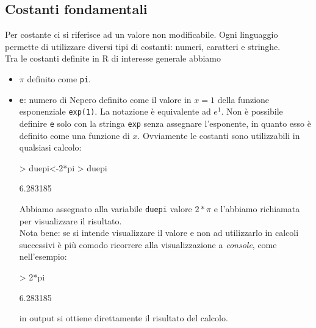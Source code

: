 \documentclass[onecolumn,11pt]{book}
\begin{document}
\subsection{Costanti fondamentali}
Per costante ci si riferisce ad un valore non modificabile. Ogni linguaggio permette di utilizzare diversi tipi di costanti: numeri, caratteri e stringhe.\\  Tra le costanti definite in \textsf{R} di interesse generale abbiamo
\begin{itemize}
\item{}$\pi$ definito come \texttt{pi}.
\item{}\texttt{e}: numero di Nepero 
definito come il  valore  in $x=1$ della funzione esponenziale \texttt{exp(1)}. La notazione \`e equivalente ad $e^1$.
Non \`e possibile definire \texttt{e} solo con la stringa \texttt{exp} senza assegnare l'esponente, in quanto esso \`e definito come una funzione di $x$.  
Ovviamente le costanti sono utilizzabili in qualsiasi calcolo:
\begin{Schunk}
\begin{Sinput}
> duepi<-2*pi
> duepi
\end{Sinput}
\begin{Soutput}
[1] 6.283185
\end{Soutput}
\end{Schunk}
Abbiamo assegnato alla variabile \texttt{duepi}  valore $2*\pi$  e l'abbiamo richiamata per visualizzare il risultato.\\
Nota bene: se si intende visualizzare il valore e non ad utilizzarlo in calcoli successivi \`e pi\`u comodo ricorrere alla visualizzazione a \emph{console}, come nell'esempio:
\begin{Schunk}
\begin{Sinput}
> 2*pi
\end{Sinput}
\begin{Soutput}
[1] 6.283185
\end{Soutput}
\end{Schunk}
in output si ottiene direttamente il risultato del calcolo.  
\end{itemize}
\end{document}
